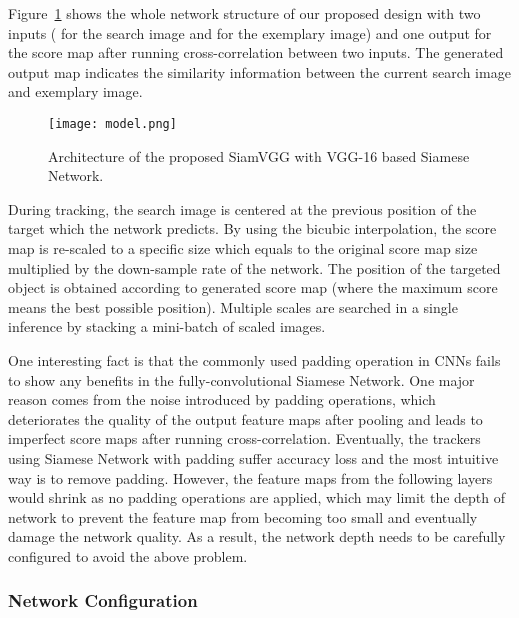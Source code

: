 \documentclass[runningheads]{llncs}
\begin{document}
Figure~\ref{fig:model} shows the whole network structure of our proposed design with two inputs ( for the search image and  for the exemplary image) and one output for the score map after running cross-correlation between two inputs. The generated output map indicates the similarity information between the current search image and exemplary image. 



\begin{figure}
\centering
\texttt{[image: model.png]}
\vspace{-8pt}
\caption{Architecture of the proposed SiamVGG with VGG-16 based Siamese Network. }
\label{fig:model}
\end{figure}

During tracking, the search image is centered at the previous position of the target which the network predicts. By using the bicubic interpolation, the score map is re-scaled to a specific size which equals to the original score map size multiplied by the down-sample rate of the network. The position of the targeted object is obtained according to generated score map (where the maximum score means the best possible position). Multiple scales are searched in a single inference by stacking a mini-batch of scaled images.

One interesting fact is that the commonly used padding operation in CNNs fails to show any benefits in the fully-convolutional Siamese Network. One major reason comes from the noise introduced by padding operations, which deteriorates the quality of the output feature maps after pooling and leads to imperfect score maps after running cross-correlation. Eventually, the trackers using Siamese Network with padding suffer accuracy loss and the most intuitive way is to remove padding. However, the feature maps from the following layers would shrink as no padding operations are applied, which may limit the depth of network to prevent the feature map from becoming too small and eventually damage the network quality. 
As a result, the network depth needs to be carefully configured to avoid the above problem. 

\subsubsection{Network Configuration}
\end{document}
